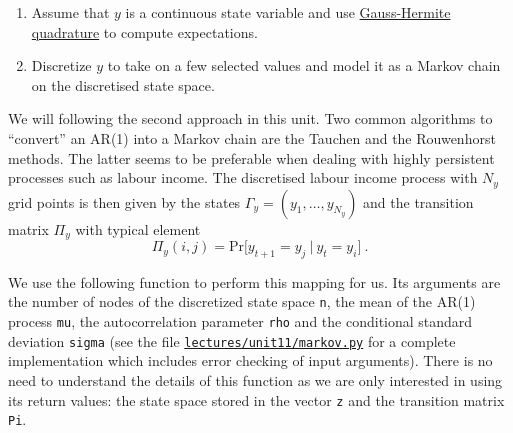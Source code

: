 \documentclass{scrartcl}
\providecommand{\tightlist}{%
      \setlength{\itemsep}{0pt}\setlength{\parskip}{0pt}}
\begin{document}
\begin{enumerate}
\def\labelenumi{\arabic{enumi}.}
\tightlist
\item
  Assume that \(y\) is a continuous state variable and use
  \href{https://en.wikipedia.org/wiki/Gauss\%E2\%80\%93Hermite_quadrature}{Gauss-Hermite
  quadrature} to compute expectations.
\item
  Discretize \(y\) to take on a few selected values and model it as a
  Markov chain on the discretised state space.
\end{enumerate}

We will following the second approach in this unit. Two common
algorithms to ``convert'' an AR(1) into a Markov chain are the Tauchen
and the Rouwenhorst methods. The latter seems to be preferable when
dealing with highly persistent processes such as labour income. The
discretised labour income process with \(N_y\) grid points is then given
by the states \(\Gamma_y = (y_1,\dots,y_{N_y})\) and the transition
matrix \(\Pi_y\) with typical element \[
\Pi_y(i,j) = \text{Pr}\bigl[y_{t+1} = y_j~|~y_t = y_i\bigr]~.
\]

We use the following function to perform this mapping for us. Its
arguments are the number of nodes of the discretized state space
\texttt{n}, the mean of the AR(1) process \texttt{mu}, the
autocorrelation parameter \texttt{rho} and the conditional standard
deviation \texttt{sigma} (see the file
\href{../lectures/unit11/markov.py}{\texttt{lectures/unit11/markov.py}}
for a complete implementation which includes error checking of input
arguments). There is no need to understand the details of this function
as we are only interested in using its return values: the state space
stored in the vector \texttt{z} and the transition matrix \texttt{Pi}.
\end{document}
